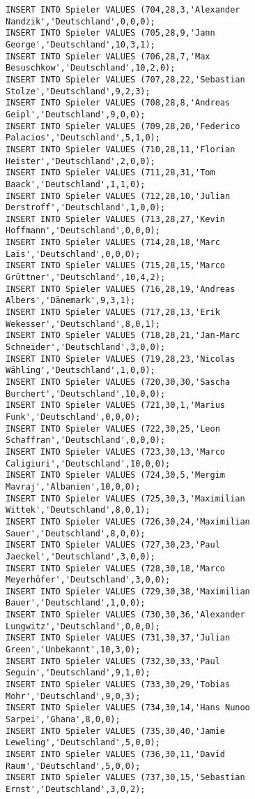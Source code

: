 \documentclass{lehramt-informatik-aufgabe}
\begin{document}
\begin{verbatim}
INSERT INTO Spieler VALUES (704,28,3,'Alexander Nandzik','Deutschland',0,0,0);
INSERT INTO Spieler VALUES (705,28,9,'Jann George','Deutschland',10,3,1);
INSERT INTO Spieler VALUES (706,28,7,'Max Besuschkow','Deutschland',10,2,0);
INSERT INTO Spieler VALUES (707,28,22,'Sebastian Stolze','Deutschland',9,2,3);
INSERT INTO Spieler VALUES (708,28,8,'Andreas Geipl','Deutschland',9,0,0);
INSERT INTO Spieler VALUES (709,28,20,'Federico Palacios','Deutschland',5,1,0);
INSERT INTO Spieler VALUES (710,28,11,'Florian Heister','Deutschland',2,0,0);
INSERT INTO Spieler VALUES (711,28,31,'Tom Baack','Deutschland',1,1,0);
INSERT INTO Spieler VALUES (712,28,10,'Julian Derstroff','Deutschland',1,0,0);
INSERT INTO Spieler VALUES (713,28,27,'Kevin Hoffmann','Deutschland',0,0,0);
INSERT INTO Spieler VALUES (714,28,18,'Marc Lais','Deutschland',0,0,0);
INSERT INTO Spieler VALUES (715,28,15,'Marco Grüttner','Deutschland',10,4,2);
INSERT INTO Spieler VALUES (716,28,19,'Andreas Albers','Dänemark',9,3,1);
INSERT INTO Spieler VALUES (717,28,13,'Erik Wekesser','Deutschland',8,0,1);
INSERT INTO Spieler VALUES (718,28,21,'Jan-Marc Schneider','Deutschland',3,0,0);
INSERT INTO Spieler VALUES (719,28,23,'Nicolas Wähling','Deutschland',1,0,0);
INSERT INTO Spieler VALUES (720,30,30,'Sascha Burchert','Deutschland',10,0,0);
INSERT INTO Spieler VALUES (721,30,1,'Marius Funk','Deutschland',0,0,0);
INSERT INTO Spieler VALUES (722,30,25,'Leon Schaffran','Deutschland',0,0,0);
INSERT INTO Spieler VALUES (723,30,13,'Marco Caligiuri','Deutschland',10,0,0);
INSERT INTO Spieler VALUES (724,30,5,'Mergim Mavraj','Albanien',10,0,0);
INSERT INTO Spieler VALUES (725,30,3,'Maximilian Wittek','Deutschland',8,0,1);
INSERT INTO Spieler VALUES (726,30,24,'Maximilian Sauer','Deutschland',8,0,0);
INSERT INTO Spieler VALUES (727,30,23,'Paul Jaeckel','Deutschland',3,0,0);
INSERT INTO Spieler VALUES (728,30,18,'Marco Meyerhöfer','Deutschland',3,0,0);
INSERT INTO Spieler VALUES (729,30,38,'Maximilian Bauer','Deutschland',1,0,0);
INSERT INTO Spieler VALUES (730,30,36,'Alexander Lungwitz','Deutschland',0,0,0);
INSERT INTO Spieler VALUES (731,30,37,'Julian Green','Unbekannt',10,3,0);
INSERT INTO Spieler VALUES (732,30,33,'Paul Seguin','Deutschland',9,1,0);
INSERT INTO Spieler VALUES (733,30,29,'Tobias Mohr','Deutschland',9,0,3);
INSERT INTO Spieler VALUES (734,30,14,'Hans Nunoo Sarpei','Ghana',8,0,0);
INSERT INTO Spieler VALUES (735,30,40,'Jamie Leweling','Deutschland',5,0,0);
INSERT INTO Spieler VALUES (736,30,11,'David Raum','Deutschland',5,0,0);
INSERT INTO Spieler VALUES (737,30,15,'Sebastian Ernst','Deutschland',3,0,2);

\end{verbatim}
\end{document}
